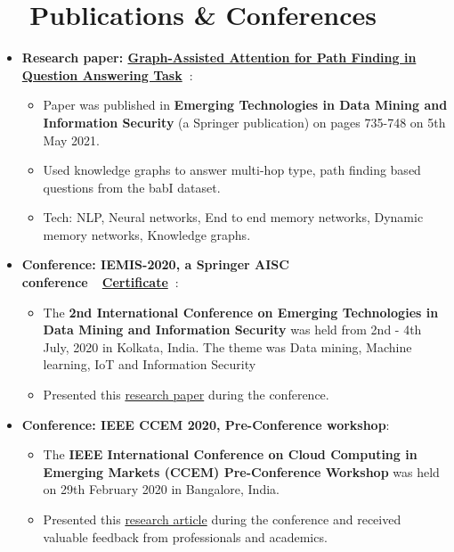 \documentclass[a4paper,20pt]{article}
\newcommand{\resumeItem}[2]{
  \item\small{
    \textbf{#1}{: #2 \vspace{-2pt}}
  }
}
\newcommand{\resumeSubItem}[2]{\resumeItem{#1}{#2}\vspace{-3pt}}
\newcommand{\resumeSubHeadingListStart}{\begin{itemize}[leftmargin=*]}
\newcommand{\resumeSubHeadingListEnd}{\end{itemize}}
\newcommand{\resumeItemListStart}{\begin{itemize}}
\newcommand{\resumeItemListEnd}{\end{itemize}\vspace{-5pt}}
\begin{document}
\section{~~Publications \& Conferences}
  \resumeSubHeadingListStart
    \resumeSubItem{Research paper: \color{blue}\href{https://link.springer.com/chapter/10.1007/978-981-15-9774-9_68}{Graph-Assisted Attention for Path Finding in Question Answering Task}~\footnotesize{\faIcon{link}}}{}
      \resumeItemListStart
        \item\small{Paper was published in \textbf{Emerging Technologies in Data Mining and Information Security} (a Springer publication) on pages 735-748 on 5th May 2021.}
        \item\small{Used knowledge graphs to answer multi-hop type, path finding based questions from the babI dataset.}
        \item\small{Tech: NLP, Neural networks, End to end memory networks, Dynamic memory networks, Knowledge graphs.}
      \resumeItemListEnd
\vspace{2pt}
    \resumeSubItem{Conference: IEMIS-2020, a Springer AISC conference~~\color{blue}\href{https://bit.ly/3FJkaq8}{Certificate}~\footnotesize{\faIcon{link}}}{}
      \resumeItemListStart
        \item\small{The \textbf{2nd International Conference on Emerging Technologies in Data Mining and Information Security} was held from 2nd - 4th July, 2020 in Kolkata, India. The theme was Data mining, Machine learning, IoT and Information Security}
        \item\small{Presented this {\color{blue}\href{https://bit.ly/3xnp758}{research paper}} during the conference.}
      \resumeItemListEnd
\vspace{2pt}
    \resumeSubItem{Conference: IEEE CCEM 2020, Pre-Conference workshop}{}
      \resumeItemListStart
        \item\small{The \textbf{IEEE International Conference on Cloud Computing in Emerging Markets (CCEM) Pre-Conference Workshop} was held on 29th February 2020 in Bangalore, India.}
        \item\small{Presented this {\color{blue}\href{https://bit.ly/2Zm3BBc}{research article}} during the conference and received valuable feedback from professionals and academics.}
      \resumeItemListEnd
  \resumeSubHeadingListEnd

\vspace{-5pt}
\end{document}
